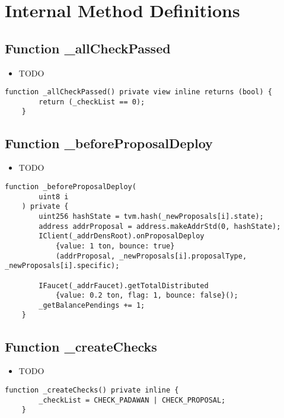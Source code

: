 \section{Internal Method Definitions}


\subsection{Function \_{}allCheckPassed}

\begin{itemize}
\item TODO
\end{itemize}

\begin{lstlisting}[firstnumber=62]
    function _allCheckPassed() private view inline returns (bool) {
        return (_checkList == 0);
    }
\end{lstlisting}

\subsection{Function \_{}beforeProposalDeploy}

\begin{itemize}
\item TODO
\end{itemize}

\begin{lstlisting}[firstnumber=134]
    function _beforeProposalDeploy(
        uint8 i
    ) private {
        uint256 hashState = tvm.hash(_newProposals[i].state);
        address addrProposal = address.makeAddrStd(0, hashState);
        IClient(_addrDensRoot).onProposalDeploy
            {value: 1 ton, bounce: true}
            (addrProposal, _newProposals[i].proposalType, _newProposals[i].specific);

        IFaucet(_addrFaucet).getTotalDistributed
            {value: 0.2 ton, flag: 1, bounce: false}();
        _getBalancePendings += 1;
    }
\end{lstlisting}

\subsection{Function \_{}createChecks}

\begin{itemize}
\item TODO
\end{itemize}

\begin{lstlisting}[firstnumber=54]
    function _createChecks() private inline {
        _checkList = CHECK_PADAWAN | CHECK_PROPOSAL;
    }
\end{lstlisting}

